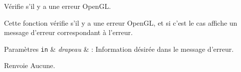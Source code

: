 Vérifie s'il y a une erreur Open\-G\-L. 

Cette fonction vérifie s'il y a une erreur Open\-G\-L, et si c'est le cas affiche un message d'erreur correspondant à l'erreur.


\begin{DoxyParams}[1]{Paramètres}
\mbox{\tt in}  & {\em drapeau} & \-: Information désirée dans le message d'erreur.\\
\hline
\end{DoxyParams}
\begin{DoxyReturn}{Renvoie}
Aucune. 
\end{DoxyReturn}
